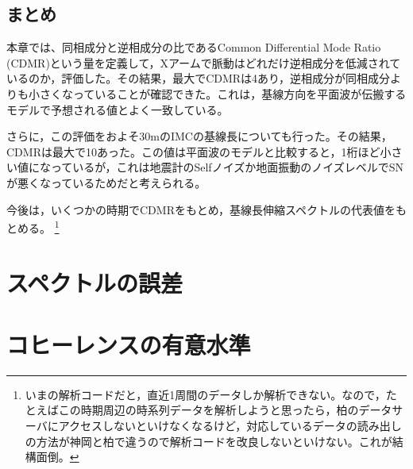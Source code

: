 \subsection{まとめ}
本章では、同相成分と逆相成分の比であるCommon Differential Mode Ratio (CDMR)という量を定義して，Xアームで脈動はどれだけ逆相成分を低減されているのか，評価した。その結果，最大でCDMRは4あり，逆相成分が同相成分よりも小さくなっていることが確認できた。これは，基線方向を平面波が伝搬するモデルで予想される値とよく一致している。

さらに，この評価をおよそ30mのIMCの基線長についても行った。その結果，CDMRは最大で10あった。この値は平面波のモデルと比較すると，1桁ほど小さい値になっているが，これは地震計のSelfノイズか地面振動のノイズレベルでSNが悪くなっているためだと考えられる。

今後は，いくつかの時期でCDMRをもとめ，基線長伸縮スペクトルの代表値をもとめる。 \footnote[13]{いまの解析コードだと，直近1周間のデータしか解析できない。なので，たとえばこの時期周辺の時系列データを解析しようと思ったら，柏のデータサーバにアクセスしないといけなくなるけど，対応しているデータの読み出しの方法が神岡と柏で違うので解析コードを改良しないといけない。これが結構面倒。}


\appendix
\section{スペクトルの誤差}
\section{コヒーレンスの有意水準}



